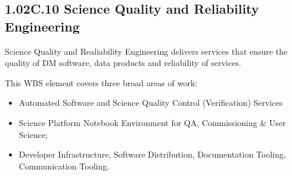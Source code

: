 \subsection{1.02C.10 Science Quality and Reliability Engineering}

Science Quality and Realiability Engineering delivers services that ensure the quality of DM software, data products and reliability of services.

This WBS element covers three broad areas of work:

\begin{itemize}

  \item{Automated Software and Science Quality Control (Verification) Services}

  \item{Science Platform Notebook Environment for QA, Commissioning \& User Science;}

  \item{Developer Infrastructure, Software Distribution, Documentation Tooling, Communication Tooling.}

\end{itemize}




